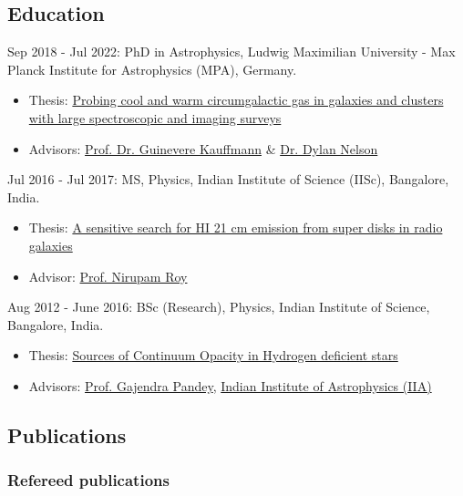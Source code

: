 \documentclass[12pt,letterpaper]{article}
\begin{document}
\subsection{Education}
\begin{list}{}{\cvlist}
  \item Sep 2018 - Jul 2022: PhD in Astrophysics, Ludwig Maximilian University - Max Planck Institute for Astrophysics (MPA), Germany.
\begin{itemize}
    \item Thesis: \href{https://edoc.ub.uni-muenchen.de/30337/}{Probing cool and warm circumgalactic gas in galaxies and clusters with large spectroscopic and imaging surveys}
    \item Advisors: \href{https://www.mpa-garching.mpg.de/galaxyformation}{Prof. Dr. Guinevere Kauffmann} \& \href{https://www.ita.uni-heidelberg.de/~dnelson/}{Dr. Dylan Nelson}
\end{itemize}

\item Jul 2016 - Jul 2017: MS, Physics, Indian Institute of Science (IISc), Bangalore, India.
\begin{itemize}
    \item Thesis: \href{/files/MS_thesis.pdf}{A sensitive search for HI 21 cm emission from super disks in radio galaxies}
    \item Advisor: \href{http://www.physics.iisc.ernet.in/%7Enroy/}{Prof. Nirupam Roy}
  \end{itemize}
\item Aug 2012 - June 2016: BSc (Research), Physics, Indian Institute of Science, Bangalore, India.
\begin{itemize}
    \item Thesis: \href{/files/BS_thesis.pdf}{Sources of Continuum Opacity in Hydrogen deficient stars}
    \item Advisors: \href{https://www.iiap.res.in/?q=user/29}{Prof. Gajendra Pandey}, \href{https://www.iiap.res.in/}{Indian Institute of Astrophysics (IIA)}
  \end{itemize}
\end{list}

\ifdefined\withpubs
  \subsection{Publications}
  

  \subsubsection{Refereed publications}
  \begin{list}{}{\cvlist}
    
  \end{list}
\end{document}

